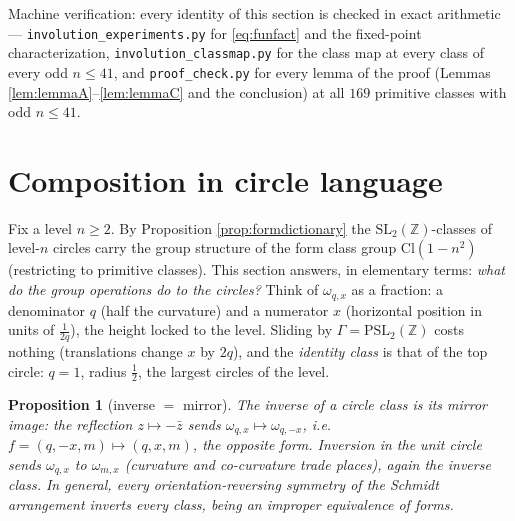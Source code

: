 \documentclass[11pt]{amsart}
\numberwithin{equation}{section}
\theoremstyle{plain}
\newtheorem{proposition}[theorem]{Proposition}
\theoremstyle{definition}
\theoremstyle{remark}
\newcommand{\Z}{\mathbb{Z}}
\newcommand{\SL}{\mathrm{SL}}
\newcommand{\PSL}{\mathrm{PSL}}
\newcommand{\Cl}{\mathrm{Cl}}
\begin{document}
Machine verification: every identity of this section is checked in
exact arithmetic --- \texttt{involution\_experiments.py} for
\eqref{eq:funfact} and the fixed-point characterization,
\texttt{involution\_classmap.py} for the class map at every class of
every odd $n \le 41$, and \texttt{proof\_check.py} for every lemma of
the proof (Lemmas \ref{lem:lemmaA}--\ref{lem:lemmaC} and the
conclusion) at all $169$ primitive classes with odd $n \le 41$.

\section{Composition in circle language}\label{sec:composition}

Fix a level $n \ge 2$.  By Proposition \ref{prop:formdictionary} the
$\SL_2(\Z)$-classes of level-$n$ circles carry the group structure of
the form class group $\Cl(1 - n^2)$ (restricting to primitive classes).
This section answers, in elementary terms: \emph{what do the group
operations do to the circles?}  Think of $\omega_{q,x}$ as a fraction:
a denominator $q$ (half the curvature) and a numerator $x$ (horizontal
position in units of $\tfrac1{2q}$), the height locked to the level.
Sliding by $\Gamma = \PSL_2(\Z)$ costs nothing (translations change
$x$ by $2q$), and the \emph{identity class} is that of the top circle:
$q = 1$, radius $\tfrac12$, the largest circles of the level.

\begin{proposition}[inverse $=$ mirror]\label{prop:mirror}
The inverse of a circle class is its mirror image: the reflection
$z \mapsto -\bar z$ sends $\omega_{q,x} \mapsto \omega_{q,-x}$, i.e.\
$f = (q, -x, m) \mapsto (q, x, m)$, the opposite form.  Inversion in
the unit circle sends $\omega_{q,x}$ to $\omega_{m,x}$ (curvature and
co-curvature trade places), again the inverse class.  In general,
\emph{every orientation-reversing symmetry of the Schmidt arrangement
inverts every class}, being an improper equivalence of forms.
\end{proposition}
\end{document}
